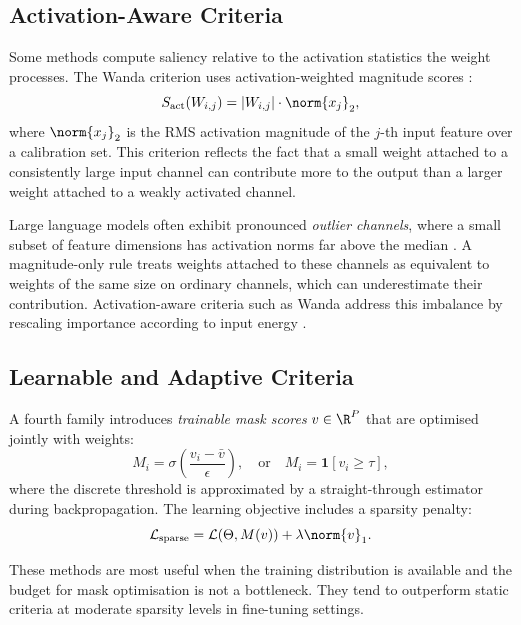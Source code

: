 \subsection{Activation-Aware Criteria}

Some methods compute saliency relative to the activation statistics the
weight processes.  The Wanda criterion uses activation-weighted magnitude
scores \cite{sun2023simple}:
\begin{equation}
	S_{\mathrm{act}}(W_{i,j}) = |W_{i,j}|\cdot\norm{x_j}_2,
	\label{eq:wanda}
\end{equation}
where $\norm{x_j}_2$ is the RMS activation magnitude of the $j$-th input
feature over a calibration set. This criterion reflects the fact that a small
weight attached to a consistently large input channel can contribute more to
the output than a larger weight attached to a weakly activated channel.

Large language models often exhibit pronounced \emph{outlier channels}, where
a small subset of feature dimensions has activation norms far above the
median \cite{wei2022outlier}. A magnitude-only rule treats weights attached to these channels as
equivalent to weights of the same size on ordinary channels, which can
underestimate their contribution. Activation-aware criteria such as Wanda
address this imbalance by rescaling importance according to input energy
\cite{sun2023simple}.

\subsection{Learnable and Adaptive Criteria}

A fourth family introduces \emph{trainable mask scores} $v \in \R^P$ that
are optimised jointly with weights:
\begin{equation}
	M_i = \sigma\!\left(\frac{v_i - \bar{v}}{\epsilon}\right),
	\quad
	\text{or}
	\quad
	M_i = \mathbf{1}[v_i \ge \tau],
	\label{eq:learnable}
\end{equation}
where the discrete threshold is approximated by a straight-through estimator
during backpropagation.  The learning objective includes a sparsity penalty:
\begin{equation}
	\mathcal{L}_{\mathrm{sparse}} = \mathcal{L}(\Theta, M(v)) + \lambda \norm{v}_1.
	\label{eq:learnable_loss}
\end{equation}

These methods are most useful when the training distribution is available and
the budget for mask optimisation is not a bottleneck.  They tend to
outperform static criteria at moderate sparsity levels in fine-tuning
settings.

